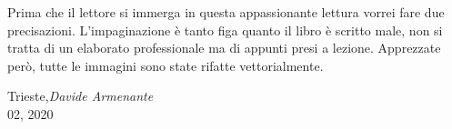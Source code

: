%
%
%

\preface

Prima che il lettore si immerga in questa appassionante lettura vorrei fare due precisazioni. L'impaginazione è tanto figa quanto il libro è scritto male, non si tratta di un elaborato professionale ma di appunti presi a lezione. Apprezzate però, tutte le immagini sono state rifatte vettorialmente.


\vspace{1cm}
\begin{flushright}\noindent
Trieste,\hfill {\it Davide Armenante}\\
02, 2020\hfill\\
\end{flushright}


